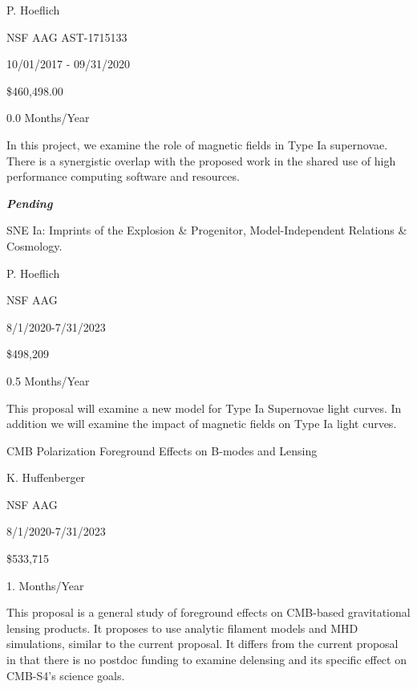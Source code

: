 \documentclass[10pt]{article}
\begin{document}
 P. Hoeflich 

 NSF AAG AST-1715133

 10/01/2017 - 09/31/2020

 \$460,498.00

 0.0 Months/Year

 In this project, we examine the role of magnetic fields in
Type Ia supernovae.  There
is a synergistic overlap with the proposed work in the shared use of high
performance computing software and resources.


\vspace{0.1in}

\noindent \large{\textbf{\emph{Pending}}}

 SNE Ia: Imprints of the Explosion \& Progenitor,
Model-Independent Relations \& Cosmology.

 P. Hoeflich 

 NSF AAG 

 8/1/2020-7/31/2023  

 \$498,209

 0.5 Months/Year

 This proposal will examine a new model for Type Ia
Supernovae light curves.
In addition we will examine the impact of magnetic fields on Type Ia light
curves.

\vspace{0.1in}

 CMB Polarization Foreground Effects on B-modes and Lensing

 K. Huffenberger    

 NSF AAG 

 8/1/2020-7/31/2023  

 \$533,715

 1. Months/Year

This proposal is a general study of foreground effects on CMB-based
gravitational lensing products. It proposes to use analytic filament models and MHD
simulations, similar to the current proposal. It differs from the current proposal in that there is
no postdoc funding to examine delensing and its specific effect on CMB-S4's science goals.

\vspace{0.1in}
\end{document}
